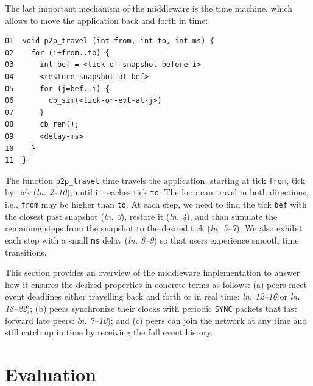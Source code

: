 \documentclass[12pt]{article}
\newcommand{\code}[1]  {\texttt{\small{#1}}}
\newcommand{\lin}[1]{(\emph{ln. #1}\xspace)}
\newcommand{\linx}[1]{\emph{ln. #1}\xspace}
\begin{document}

The last important mechanism of the middleware is the time machine, which
allows to move the application back and forth in time:

{\footnotesize
\begin{verbatim}
01  void p2p_travel (int from, int to, int ms) {
02    for (i=from..to) {
03      int bef = <tick-of-snapshot-before-i>
04      <restore-snapshot-at-bef>
05      for (j=bef..i) {
06        cb_sim(<tick-or-evt-at-j>)
07      }
08      cb_ren();
09      <delay-ms>
10    }
11  }
\end{verbatim}
}

The function \code{p2p\_travel} time travels the application, starting at tick
\code{from}, tick by tick \lin{2--10}, until it reaches tick \code{to}.
The loop can travel in both directions, i.e., \code{from} may be higher than
\code{to}.
At each step, we need to find the tick \code{bef} with the closest past
snapshot \lin{3}, restore it \lin{4}, and than simulate the remaining steps
from the snapshot to the desired tick \lin{5--7}.
We also exhibit each step with a small \code{ms} delay \lin{8--9} so that users
experience smooth time transitions.


This section provides an overview of the middleware implementation to answer
how it ensures the desired properties in concrete terms as follows:
    (a) peers meet event deadlines either travelling back and forth or in real
        time: \linx{12--16} or \linx{18--22});
    (b) peers synchronize their clocks with periodic \code{SYNC} packets that
        fast forward late peers: \linx{7--10}); and
    (c) peers can join the network at any time and still catch up in time by
        receiving the full event history.

\section{Evaluation}
\label{sec.eval}
\end{document}
